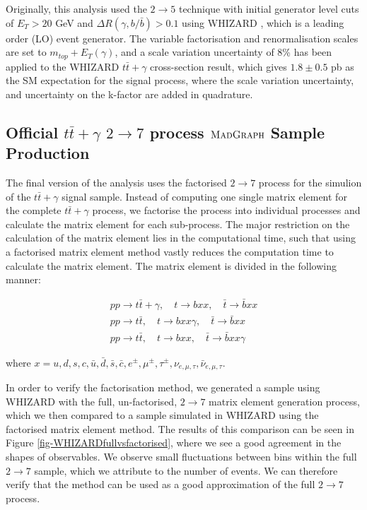 Originally, this analysis used the $2 \to 5$ technique with initial generator level cuts of $E_T > 20$ GeV and $\Delta R(\gamma, b/\bar{b}) > 0.1$ using WHIZARD \cite{WHIZARD}, which is a leading order (LO) event generator. The variable factorisation and renormalisation scales are set to $m_{top} + E_T(\gamma)$, and a scale variation uncertainty of 8\% has been applied to the WHIZARD $t\bar{t}+\gamma$ cross-section result, which gives $1.8 \pm 0.5$ pb as the SM expectation for the signal process, where the scale variation uncertainty, and uncertainty on the k-factor are added in quadrature. 


\subsection{Official $t\bar{t}+\gamma$ $2 \to 7$ process $\textsc{MadGraph}$ Sample Production}

The final version of the analysis uses the factorised $2 \to 7$ process for the simulion of the $t\bar{t}+\gamma$ signal sample. Instead of computing one single matrix element for the complete $t\bar{t}+\gamma$ process, we factorise the process into individual processes and calculate the matrix element for each sub-process. The major restriction on the calculation of the matrix element lies in the computational time, such that using a factorised matrix element method vastly reduces the computation time to calculate the matrix element. The matrix element is divided in the following manner:

\begin{align}
pp \to t\bar{t}+\gamma, \quad t \to bxx, \quad \bar{t} \to \bar{b}xx \\
pp \to t\bar{t}, \quad t \to bxx\gamma, \quad \bar{t} \to \bar{b}xx \\
pp \to t\bar{t}, \quad t \to bxx, \quad \bar{t} \to \bar{b}xx\gamma 
\end{align}

where $x = u,d,s,c,\bar{u},\bar{d},\bar{s},\bar{c}, e^{\pm}, \mu^{\pm}, \tau^{\pm}, \nu_{e,\mu,\tau}, \bar{\nu}_{e,\mu,\tau}$.

In order to verify the factorisation method, we generated a sample using WHIZARD with the full, un-factorised, $2 \to 7$ matrix element generation process, which we then compared to a sample simulated in WHIZARD using the factorised matrix element method. The results of this comparison can be seen in Figure \ref{fig-WHIZARDfullvsfactorised}, where we see a good agreement in the shapes of observables. We observe small fluctuations between bins within the full $2 \to 7$ sample, which we attribute to the number of events. We can therefore verify that the method can be used as a good approximation of the full $2 \to 7$ process.

